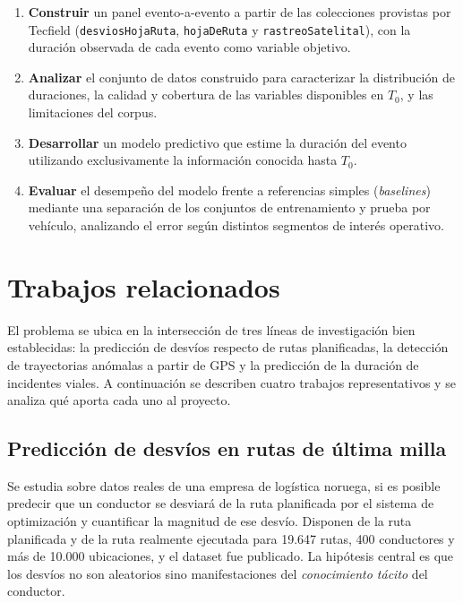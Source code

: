 \documentclass[12pt, a4paper]{article}
\begin{document}
\begin{enumerate}
  \item \textbf{Construir} un panel evento-a-evento a partir de las colecciones
  provistas por Tecfield (\texttt{desviosHojaRuta}, \texttt{hojaDeRuta} y
  \texttt{rastreoSatelital}), con la duración observada de cada evento como
  variable objetivo.
  \item \textbf{Analizar} el conjunto de datos construido para caracterizar la
  distribución de duraciones, la calidad y cobertura de las variables
  disponibles en $T_0$, y las limitaciones del corpus.
  \item \textbf{Desarrollar} un modelo predictivo que estime la duración del
  evento utilizando exclusivamente la información conocida hasta $T_0$.
  \item \textbf{Evaluar} el desempeño del modelo frente a referencias simples
  (\emph{baselines}) mediante una separación de los conjuntos de entrenamiento
  y prueba por vehículo, analizando el error según distintos segmentos de
  interés operativo.
\end{enumerate}
\section{Trabajos relacionados}

El problema se ubica en la intersección de tres líneas de
investigación bien establecidas: la predicción de desvíos respecto de rutas
planificadas, la detección de trayectorias anómalas a partir de GPS y la
predicción de la duración de incidentes viales. A continuación se describen
cuatro trabajos representativos y se analiza qué aporta cada uno al proyecto.

\subsection{Predicción de desvíos en rutas de última milla
  \cite{konovalenko2026}}

Se estudia sobre datos reales de una empresa de
logística noruega, si es posible predecir que un conductor se desviará de la
ruta planificada por el sistema de optimización y cuantificar la magnitud de
ese desvío. Disponen de la ruta planificada y de la ruta realmente ejecutada
para 19.647 rutas, 400 conductores y más de 10.000 ubicaciones, y el dataset
fue publicado. La hipótesis central es que los desvíos no son aleatorios sino
manifestaciones del \emph{conocimiento tácito} del conductor.
\end{document}
